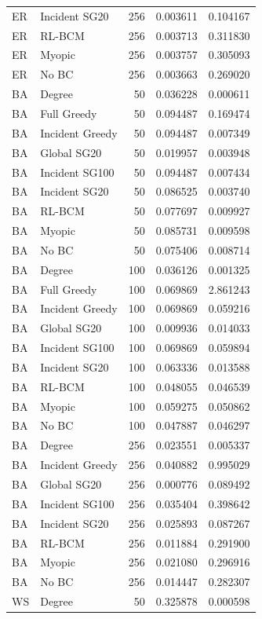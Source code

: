 \begin{longtable}{llrrr}
ER & Incident SG20 & 256 & 0.003611 & 0.104167\\
ER & RL-BCM & 256 & 0.003713 & 0.311830\\
ER & Myopic & 256 & 0.003757 & 0.305093\\
ER & No BC & 256 & 0.003663 & 0.269020\\
BA & Degree & 50 & 0.036228 & 0.000611\\
BA & Full Greedy & 50 & 0.094487 & 0.169474\\
BA & Incident Greedy & 50 & 0.094487 & 0.007349\\
BA & Global SG20 & 50 & 0.019957 & 0.003948\\
BA & Incident SG100 & 50 & 0.094487 & 0.007434\\
BA & Incident SG20 & 50 & 0.086525 & 0.003740\\
BA & RL-BCM & 50 & 0.077697 & 0.009927\\
BA & Myopic & 50 & 0.085731 & 0.009598\\
BA & No BC & 50 & 0.075406 & 0.008714\\
BA & Degree & 100 & 0.036126 & 0.001325\\
BA & Full Greedy & 100 & 0.069869 & 2.861243\\
BA & Incident Greedy & 100 & 0.069869 & 0.059216\\
BA & Global SG20 & 100 & 0.009936 & 0.014033\\
BA & Incident SG100 & 100 & 0.069869 & 0.059894\\
BA & Incident SG20 & 100 & 0.063336 & 0.013588\\
BA & RL-BCM & 100 & 0.048055 & 0.046539\\
BA & Myopic & 100 & 0.059275 & 0.050862\\
BA & No BC & 100 & 0.047887 & 0.046297\\
BA & Degree & 256 & 0.023551 & 0.005337\\
BA & Incident Greedy & 256 & 0.040882 & 0.995029\\
BA & Global SG20 & 256 & 0.000776 & 0.089492\\
BA & Incident SG100 & 256 & 0.035404 & 0.398642\\
BA & Incident SG20 & 256 & 0.025893 & 0.087267\\
BA & RL-BCM & 256 & 0.011884 & 0.291900\\
BA & Myopic & 256 & 0.021080 & 0.296916\\
BA & No BC & 256 & 0.014447 & 0.282307\\
WS & Degree & 50 & 0.325878 & 0.000598\\

\end{longtable}
